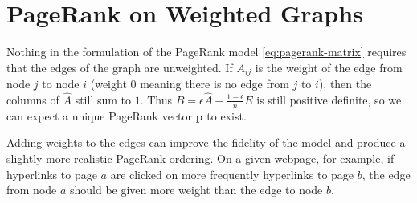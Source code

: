 \section*{PageRank on Weighted Graphs} %

Nothing in the formulation of the PageRank model \eqref{eq:pagerank-matrix} requires that the edges of the graph are unweighted.
If $A_{ij}$ is the weight of the edge from node $j$ to node $i$ (weight $0$ meaning there is no edge from $j$ to $i$), then the columns of $\widehat{A}$ still sum to $1$.
Thus $B = \epsilon \widehat{A} + \frac{1-\epsilon}{n}E$ is still positive definite, so we can expect a unique PageRank vector $\mathbf{p}$ to exist.

Adding weights to the edges can improve the fidelity of the model and produce a slightly more realistic PageRank ordering.
On a given webpage, for example, if hyperlinks to page $a$ are clicked on more frequently hyperlinks to page $b$, the edge from node $a$ should be given more weight than the edge to node $b$.

